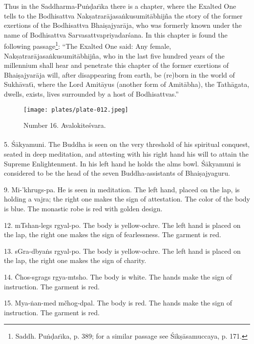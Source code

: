 \documentclass[a4paper, 12pt, oneside]{article}
\begin{document}
Thus in the Saddharma-Pu\.{n}\d{d}ar\={\i}ka there is a chapter, where the Exalted One tells to the Bodhisattva Nak\d{s}atrar\={a}jasa\.{n}kusumit\={a}bhij\~{n}a the story of the former exertions of the Bodhisattva Bhai\d{s}ajyar\={a}ja, who was formerly known under the name of Bodhisattva Sarvasattvapriyadar\'{s}ana. In this chapter is found the following passage\footnote{Saddh. Pu\.{n}\d{d}ar\={\i}ka, p. 389; for a similar passage see \'{S}ik\d{s}\={a}samuccaya, p. 171.}: ``The Exalted One said: Any female, Nak\d{s}atrar\={a}jasa\.{n}kusumit\={a}bhij\~{n}a, who in the last five hundred years of the millennium shall hear and penetrate this chapter of the former exertions of Bhai\d{s}ajyar\={a}ja will, after disappearing from earth, be (re)born in the world of Sukh\={a}vat\={\i}, where the Lord Amit\={a}yus (another form of Amit\={a}bha), the Tath\={a}gata, dwells, exists, lives surrounded by a host of Bodhisattvas.''

\clearpage
\begin{figure}[H]
\centering
\texttt{[image: plates/plate-012.jpeg]}
\caption*{Number 16. Avalokite\'{s}vara.}
\end{figure}
\clearpage
\paragraph{}
5. \'{S}\={a}kyamuni. The Buddha is seen on the very threshold of his spiritual conquest, seated in deep meditation, and attesting with his right hand his will to attain the Supreme Enlightenment. In his left hand he holds the alms bowl. \'{S}\={a}kyamuni is considered to be the head of the seven Buddha-assistants of Bhai\d{s}ajyaguru.

9. Mi-'khrugs-pa. He is seen in meditation. The left hand, placed on the lap, is holding a vajra; the right one makes the sign of attestation. The color of the body is blue. The monastic robe is red with golden design.

12. mTshan-legs rgyal-po. The body is yellow-ochre. The left hand is placed on the lap, the right one makes the sign of fearlessness. The garment is red.

13. sGra-dbya\.{n}s rgyal-po. The body is yellow-ochre. The left hand is placed on the lap, the right one makes the sign of charity.

14. Čhos-sgrags rgya-mtsho. The body is white. The hands make the sign of instruction. The garment is red.

15. Mya-\.{n}an-med mčhog-dpal. The body is red. The hands make the sign of instruction. The garment is red.
\end{document}
